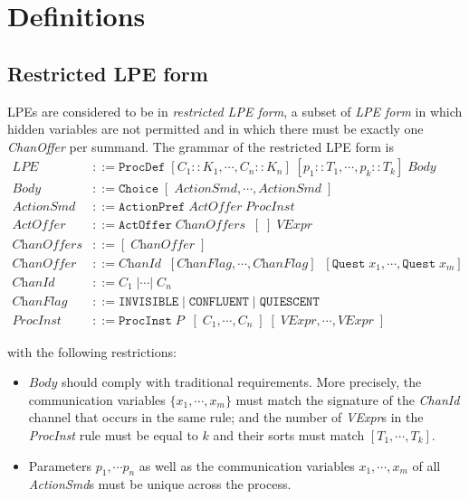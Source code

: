 \chapter{Definitions}

\section{Restricted LPE form} \label{restricted-lpe}

LPEs are considered to be in \emph{restricted LPE form}, a subset of \emph{LPE form} in which hidden variables are not permitted and in which there must be exactly one \textit{ChanOffer} per summand.
The grammar of the restricted LPE form is
\begin{align*}
\textit{LPE} &::= \texttt{ProcDef} \; [C_1 :: K_1, \cdots{}, C_n :: K_n] \; [p_1 :: T_1, \cdots{}, p_k :: T_k] \; \textit{Body} \\
\textit{Body} &::= \texttt{Choice} \; [ \;\! \textit{ActionSmd}, \cdots{}, \textit{ActionSmd} \; ] \\
\textit{ActionSmd} &::= \texttt{ActionPref} \; \textit{ActOffer} \; \textit{ProcInst} \\
\textit{ActOffer} &::= \texttt{ActOffer} \; \textit{ChanOffers} \;\; [\;] \; \textit{VExpr} \\
\textit{ChanOffers} &::= [ \;\! \textit{ChanOffer} \; ] \\
\textit{ChanOffer} &::= \textit{ChanId} \;\; [\textit{ChanFlag}, \cdots{}, \textit{ChanFlag}] \;\; [\texttt{Quest} \; x_1, \cdots{}, \texttt{Quest} \; x_m] \\
\textit{ChanId} &::= C_1 \;| \cdots{} |\; C_n \\
\textit{ChanFlag} &::= \texttt{INVISIBLE} \;|\; \texttt{CONFLUENT} \;|\; \texttt{QUIESCENT} \\
\textit{ProcInst} &::= \texttt{ProcInst} \; P \; \; [ \; C_1, \cdots{}, C_n \; ] \; [\;\!\textit{VExpr}, \cdots{}, \textit{VExpr} \; ]
\end{align*}

with the following restrictions:
\begin{itemize}
\item $\textit{Body}$ should comply with traditional \txs{} requirements.
More precisely, the communication variables $\{ x_1, \cdots{}, x_m \}$ must match the signature of the \textit{ChanId} channel that occurs in the same rule; and the number of \textit{VExpr}s in the \textit{ProcInst} rule must be equal to $k$ and their sorts must match $[T_1, \cdots{}, T_k]$.
\item Parameters $p_1\comma \cdots{} p_n$ as well as the communication variables $x_1\comma \cdots{}\comma x_m$ of all \textit{ActionSmd}s must be unique across the process.
\end{itemize}

